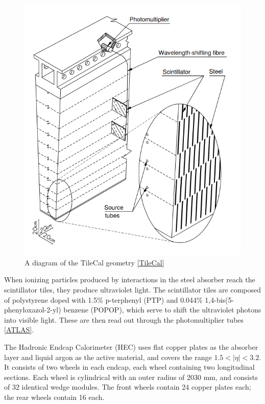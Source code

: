 \begin{figure}
  \includegraphics[width=\linewidth]{figures/detector_chapter/TileCal.png}
  \caption{A diagram of the TileCal geometry \ref{TileCal}}
  \label{fig:TileCalDiagram}
\end{figure}

When ionizing particles produced by interactions in the steel absorber reach the scintillator tiles, they produce ultraviolet light. The scintillator tiles are composed of polystyrene doped with 1.5\%  p-terphenyl (PTP) and 0.044\% 1,4-bis(5-phenyloxazol-2-yl) benzene (POPOP), which serve to shift the ultraviolet photons into visible light. These are then read out through the photomultiplier tubes \ref{ATLAS}.

The Hadronic Endcap Calorimeter (HEC) uses flat copper plates as the absorber layer and liquid argon as the active material, and covers the range  $1.5 < | \eta | < 3.2 $. It consists of two wheels in each endcap, each wheel containing two longitudinal sections. Each wheel is cylindrical with an outer radius of 2030 mm, and consists of 32 identical wedge modules. The front wheels contain 24 copper plates each; the rear wheels contain 16 each.

